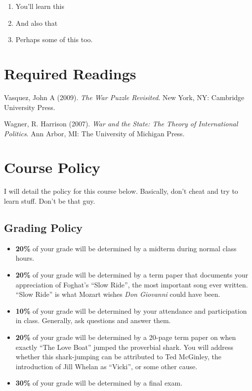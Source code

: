 \documentclass[11pt,]{article}
\begin{document}
\begin{enumerate}
\def\labelenumi{\arabic{enumi}.}
\item
  You'll learn this
\item
  And also that
\item
  Perhaps some of this too.
\end{enumerate}

\section{Required Readings}\label{required-readings}

Vasquez, John A (2009). \emph{The War Puzzle Revisited}. New York, NY:
Cambridge University Press.

Wagner, R. Harrison (2007).
\emph{War and the State: The Theory of International Politics}. Ann
Arbor, MI: The University of Michigan Press.

\section{Course Policy}\label{course-policy}

I will detail the policy for this course below. Basically, don't cheat
and try to learn stuff. Don't be that guy.

\subsection{Grading Policy}\label{grading-policy}

\begin{itemize}
\item
  \textbf{20\%} of your grade will be determined by a midterm during
  normal class hours.
\item
  \textbf{20\%} of your grade will be determined by a term paper that
  documents your appreciation of Foghat's ``Slow Ride'', the most
  important song ever written. ``Slow Ride'' is what Mozart wishes
  \emph{Don Giovanni} could have been.
\item
  \textbf{10\%} of your grade will be determined by your attendance and
  participation in class. Generally, ask questions and answer them.
\item
  \textbf{20\%} of your grade will be determined by a 20-page term paper
  on when exactly ``The Love Boat'' jumped the proverbial shark. You
  will address whether this shark-jumping can be attributed to Ted
  McGinley, the introduction of Jill Whelan as ``Vicki'', or some other
  cause.
\item
  \textbf{30\%} of your grade will be determined by a final exam.
\end{itemize}
\end{document}
